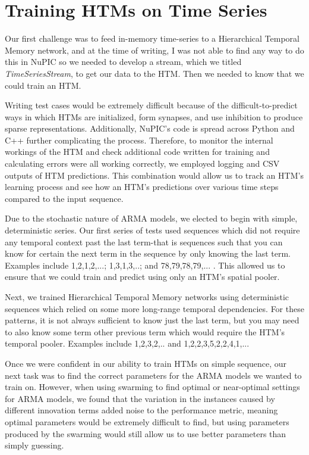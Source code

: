 \documentclass[oneside,12pt,openany]{book}
\begin{document}
    

\FloatBarrier
    
    \section{Training HTMs on Time Series}
    
    Our first challenge was to feed in-memory time-series to a Hierarchical Temporal Memory network, and at the time of writing, I was not able to find any way to do this in NuPIC so we needed to develop a stream, which we titled \textit{TimeSeriesStream}, to get our data to the HTM. Then we needed to know that we could train an HTM. 
    
    Writing test cases would be extremely difficult because of the difficult-to-predict ways in which HTMs are initialized, form synapses, and use inhibition to produce sparse representations. Additionally, NuPIC's code is spread across Python and C++ further complicating the process. Therefore, to monitor the internal workings of the HTM and check additional code written for training and calculating errors were all working correctly, we employed logging and CSV outputs of HTM predictions. This combination would allow us to track an HTM's learning process and see how an HTM's predictions over various time steps compared to the input sequence.
    
    Due to the stochastic nature of ARMA models, we elected to begin with simple, deterministic series. Our first series of tests used sequences which did not require any temporal context past the last term-that is sequences such that you can know for certain the next term in the sequence by only knowing the last term. Examples include 1,2,1,2,...; 1,3,1,3,..; and 78,79,78,79,... . This allowed us to ensure that we could train and predict using only an HTM's spatial pooler.
    
    Next, we trained Hierarchical Temporal Memory networks using deterministic sequences which relied on some more long-range temporal dependencies. For these patterns, it is not always sufficient to know just the last term, but you may need to also know some term other previous term which would require the HTM's temporal pooler. Examples include 1,2,3,2,.. and 1,2,2,3,5,2,2,4,1,... 
    
    Once we were confident in our ability to train HTMs on simple sequence, our next task was to find the correct parameters for the ARMA models we wanted to train on. However, when using swarming to find optimal or near-optimal settings for ARMA models, we found that the variation in the instances caused by different innovation terms added noise to the performance metric, meaning optimal parameters would be extremely difficult to find, but using parameters produced by the swarming would still allow us to use better parameters than simply guessing.
    
\end{document}
